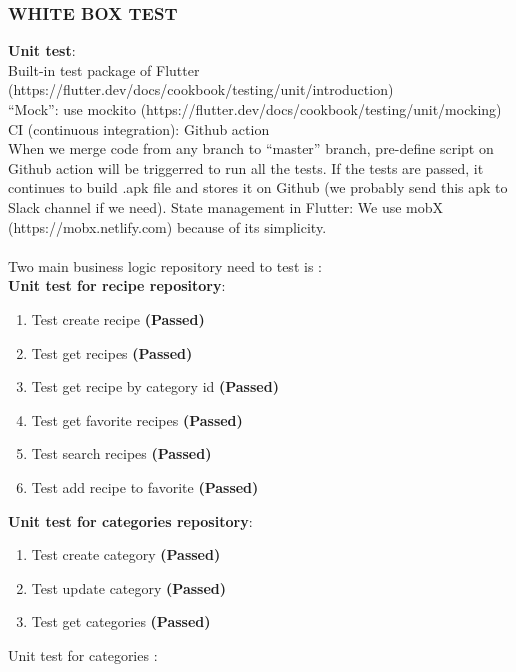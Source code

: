 \documentclass{article}
\begin{document}
\subsubsection{ WHITE BOX TEST} 
\textbf{Unit test}: \\
        Built-in test package of Flutter (https://flutter.dev/docs/cookbook/testing/unit/introduction) \\
        “Mock”: use mockito (https://flutter.dev/docs/cookbook/testing/unit/mocking) \\
        CI (continuous integration): Github action \\
        When we merge code from any branch to “master” branch, pre-define script on Github action will be triggerred to run all the tests. If the tests are passed, it continues to build .apk file and stores it on Github (we probably send this apk to Slack channel if we need).
        State management in Flutter: We use mobX (https://mobx.netlify.com) because of its simplicity.\\ \\
    Two main business logic repository need to test is :  \\
    \textbf{Unit test for recipe repository}: 
    \begin{enumerate}
        \item Test create recipe \textbf{(Passed)}
        \item Test get recipes \textbf{(Passed)}
        \item Test get recipe by category id \textbf{(Passed)}
        \item Test get favorite recipes \textbf{(Passed)}
        \item Test search recipes \textbf{(Passed)}
        \item Test add recipe to favorite \textbf{(Passed)}
    \end{enumerate} 
    \newline
\textbf{Unit test for categories repository}: 
      \begin{enumerate}
        \item Test create category \textbf{(Passed)}
        \item Test update category \textbf{(Passed)}
        \item Test get categories \textbf{(Passed)}
    \end{enumerate} 
    \newpage
    Unit test for categories : 
\end{document}

